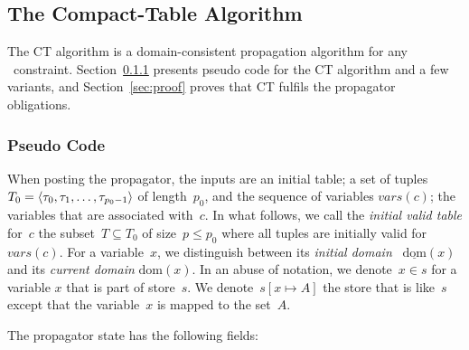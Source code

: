 \documentclass[a4paper,11pt]{article}
\newcommand{\Secref}[1]{Section~\ref{#1}}
\newcommand{\Table}{\Constraint{Table}}
\newcommand{\Dom}[1]{\text{dom}({#1})}
\newcommand{\Dominit}[1]{\underline{\text{dom}}(#1)}
\numberwithin{equation}{section}
\begin{document}
\subsection{The Compact-Table Algorithm}
\label{sec:ct}
The CT algorithm is a domain-consistent propagation
algorithm for any \Table~constraint. \Secref{ct:pseudo}
presents pseudo code for the CT algorithm and a few variants,
and \Secref{sec:proof} proves that CT fulfils the propagator
obligations.

\subsubsection{Pseudo Code}
\label{ct:pseudo}

When posting the propagator, the inputs are an initial table;
a set of tuples $T_0 = \left\langle\tau_0, \tau_1, \ldots, \tau_{p_0-1}\right\rangle$ of
length~$p_0$, and the sequence of variables $\mathit{vars}(c)$; 
the variables that are associated with~$c$.
In what follows, we call the \emph{initial valid table}
for~$c$ the subset~$T \subseteq T_0$ of size~$p \leq p_0$ where all
tuples are initially valid for~$\mathit{vars}(c)$.
For a variable~$x$, we distinguish between its \emph{initial domain}
~$\Dominit{x}$ and its \emph{current domain} $\Dom{x}$.
In an abuse of notation, we denote~$x \in s$ for a variable
$x$ that is part of store~$s$. We denote~$s[x \mapsto A]$
the store that is like~$s$ except that the variable~$x$ is mapped
to the set~$A$.

The propagator state has the following fields:
\end{document}
